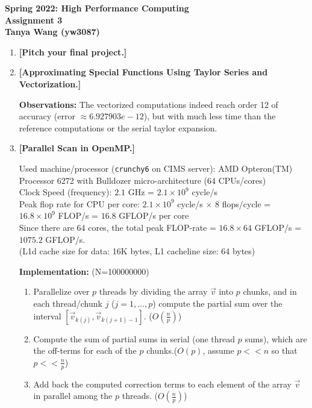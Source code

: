 \documentclass[11pt]{article}
\begin{document}
\begin{center}
\vspace*{-2cm}

\end{center}
\vspace*{.5cm}
\begin{center}
\large \textbf{%
Spring 2022: High Performance Computing}\\
\textbf{ Assignment 3}\\
\large \textbf{%
Tanya Wang (yw3087)}\\
\end{center}


\begin{enumerate}
    \item {\bf [Pitch your final project.]}
    
    
    \item {\bf [Approximating Special Functions Using Taylor Series and Vectorization.]}
    
    \textbf{Observations:} 
   The vectorized computations indeed reach order 12 of accuracy (error $\approx 6.927903e-12$), but with much less time than the reference computations or the serial taylor expansion.
   
    
   \item {\bf [Parallel Scan in OpenMP.]}
   
   Used machine/processor (\texttt{crunchy6} on CIMS server): AMD Opteron(TM) Processor 6272 with Bulldozer micro-architecture (64 CPUs/cores)\\
    Clock Speed (frequency): $2.1$ GHz = $2.1\times 10^9$ cycle/s\\
    Peak flop rate for CPU per core:
        $2.1\times 10^9$ cycle/s $\times$ $8$ flops/cycle = $16.8 \times 10^9$ FLOP/s = $16.8$ GFLOP/s per core\\
    Since there are 64 cores, the total peak FLOP-rate = $16.8\times 64$ GFLOP/s = $1075.2$ GFLOP/s.\\
   (L1d cache size for data: 16K bytes, L1 cacheline size: 64 bytes)
   
   \textbf{Implementation:} (N=100000000)
\begin{enumerate}
    \item Parallelize over $p$ threads by dividing the array $\vec v$ into $p$ chunks, and in each thread/chunk $j$ ($j = 1, \dots, p$) compute the partial sum over the interval $[\vec v_{k(j)},\vec v_{k(j+1)-1}]$. ($O(\frac{n}{p})$)
    \item Compute the sum of partial sums in serial (one thread $p$ sums), which are the off-terms for each of the $p$ chunks.($O(p)$, assume $p<<n$ so that $p<<\frac{n}{p}$)
    \item Add back the computed correction terms to each element of the array $\vec v$ in parallel among the $p$ threads. ($O(\frac{n}{p})$)
\end{enumerate}
   

\end{enumerate}
\end{document}
